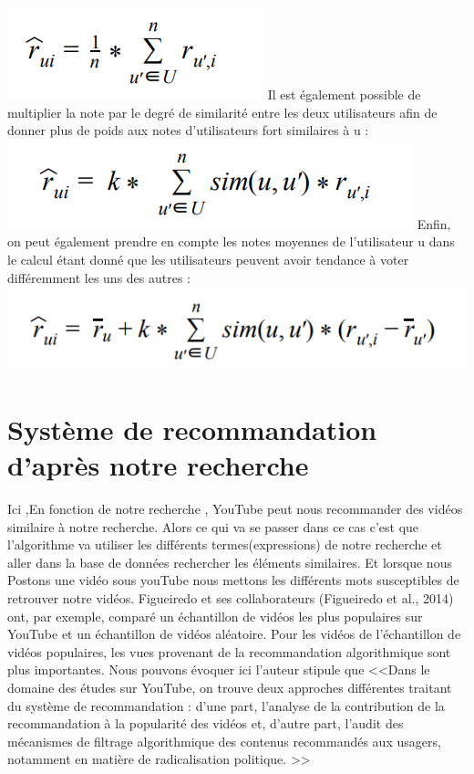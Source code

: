 \documentclass[12pt,a4paper]{article}
\begin{document}
\includegraphics[width=0.8\linewidth]{Capture 5}
Il est également possible de multiplier la note par le degré de similarité entre les deux utilisateurs afin de donner plus de poids aux notes d'utilisateurs fort similaires à u :
\includegraphics[width=1\linewidth]{Capture 6}
Enfin, on peut également prendre en compte les notes moyennes de l'utilisateur u dans le calcul étant donné que les utilisateurs peuvent avoir tendance à voter différemment les uns des autres :
\includegraphics[width=1\linewidth]{Capture 7}

	
\section{Système de recommandation d'après notre recherche}
Ici ,En fonction de notre recherche , YouTube peut nous recommander des vidéos similaire à notre
recherche. Alors ce qui va se passer dans ce cas c'est que l'algorithme va utiliser les différents termes(expressions) de notre recherche et aller
dans la base de données rechercher les éléments similaires. Et lorsque nous Postons une vidéo sous youTube nous mettons les différents mots 
susceptibles de retrouver notre vidéos. Figueiredo et ses collaborateurs (Figueiredo et al., 2014) ont, par
exemple, comparé un échantillon de vidéos les plus populaires sur
YouTube et un échantillon de vidéos aléatoire. Pour les vidéos de
l’échantillon de vidéos populaires, les vues provenant de la
recommandation algorithmique sont plus importantes. Nous pouvons évoquer ici
\cite{benbouzid2020cadran} l'auteur stipule que <<Dans le domaine des études sur YouTube, on trouve deux approches
différentes traitant du système de recommandation : d'une part, l'analyse de la contribution de la recommandation à la popularité des
vidéos et, d'autre part, l'audit des mécanismes de filtrage algorithmique
des contenus recommandés aux usagers, notamment en matière de
radicalisation politique. >>  
\end{document}

